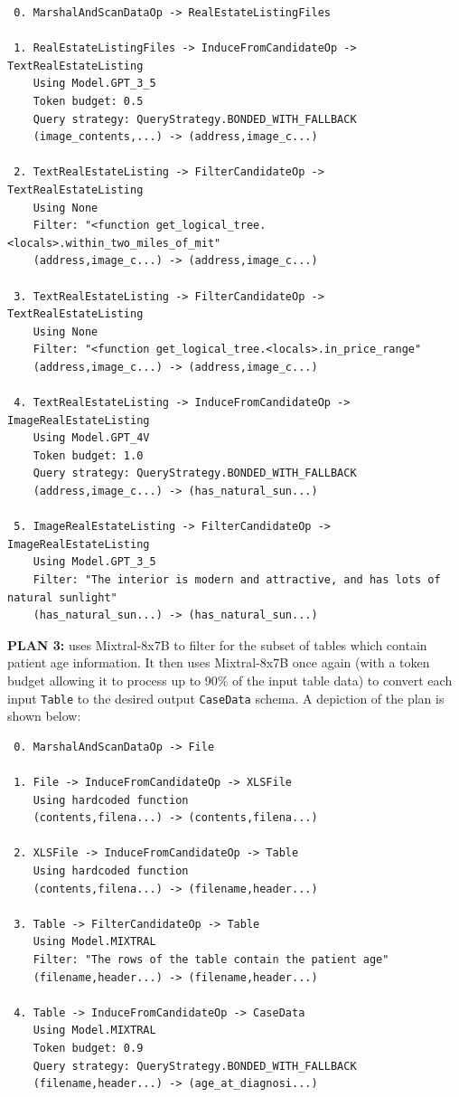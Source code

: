 \begin{lstlisting}
 0. MarshalAndScanDataOp -> RealEstateListingFiles 

 1. RealEstateListingFiles -> InduceFromCandidateOp -> TextRealEstateListing 
    Using Model.GPT_3_5
    Token budget: 0.5
    Query strategy: QueryStrategy.BONDED_WITH_FALLBACK
    (image_contents,...) -> (address,image_c...)

 2. TextRealEstateListing -> FilterCandidateOp -> TextRealEstateListing 
    Using None
    Filter: "<function get_logical_tree.<locals>.within_two_miles_of_mit"
    (address,image_c...) -> (address,image_c...)

 3. TextRealEstateListing -> FilterCandidateOp -> TextRealEstateListing 
    Using None
    Filter: "<function get_logical_tree.<locals>.in_price_range"
    (address,image_c...) -> (address,image_c...)

 4. TextRealEstateListing -> InduceFromCandidateOp -> ImageRealEstateListing 
    Using Model.GPT_4V
    Token budget: 1.0
    Query strategy: QueryStrategy.BONDED_WITH_FALLBACK
    (address,image_c...) -> (has_natural_sun...)

 5. ImageRealEstateListing -> FilterCandidateOp -> ImageRealEstateListing 
    Using Model.GPT_3_5
    Filter: "The interior is modern and attractive, and has lots of natural sunlight"
    (has_natural_sun...) -> (has_natural_sun...)
\end{lstlisting}

\textbf{PLAN 3:} uses Mixtral-8x7B to filter for the subset of tables which contain patient age information. It then uses Mixtral-8x7B once again (with a token budget allowing it to process up to 90\% of the input table data) to convert each input \texttt{Table} to the desired output \texttt{CaseData} schema. A depiction of the plan is shown below:

\begin{lstlisting}
 0. MarshalAndScanDataOp -> File 

 1. File -> InduceFromCandidateOp -> XLSFile 
    Using hardcoded function
    (contents,filena...) -> (contents,filena...)

 2. XLSFile -> InduceFromCandidateOp -> Table 
    Using hardcoded function
    (contents,filena...) -> (filename,header...)

 3. Table -> FilterCandidateOp -> Table 
    Using Model.MIXTRAL
    Filter: "The rows of the table contain the patient age"
    (filename,header...) -> (filename,header...)

 4. Table -> InduceFromCandidateOp -> CaseData 
    Using Model.MIXTRAL
    Token budget: 0.9
    Query strategy: QueryStrategy.BONDED_WITH_FALLBACK
    (filename,header...) -> (age_at_diagnosi...)
\end{lstlisting}


